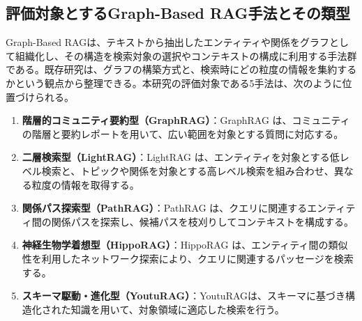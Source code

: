 \documentclass[a4j,dvipdfmx]{jsarticle}
\begin{document}
\subsection{評価対象とするGraph-Based RAG手法とその類型}
Graph-Based RAGは、テキストから抽出したエンティティや関係をグラフとして組織化し、その構造を検索対象の選択やコンテキストの構成に利用する手法群である。既存研究は、グラフの構築方式と、検索時にどの粒度の情報を集約するかという観点から整理できる\cite{pan2024unifying}。本研究の評価対象である5手法は、次のように位置づけられる。
\begin{enumerate}
    \item \textbf{階層的コミュニティ要約型（GraphRAG）}：GraphRAG \cite{edge2024graphrag} は、コミュニティの階層と要約レポートを用いて、広い範囲を対象とする質問に対応する。
    \item \textbf{二層検索型（LightRAG）}：LightRAG \cite{guo2024lightrag} は、エンティティを対象とする低レベル検索と、トピックや関係を対象とする高レベル検索を組み合わせ、異なる粒度の情報を取得する。
    \item \textbf{関係パス探索型（PathRAG）}：PathRAG \cite{chen2024pathrag} は、クエリに関連するエンティティ間の関係パスを探索し、候補パスを枝刈りしてコンテキストを構成する。
    \item \textbf{神経生物学着想型（HippoRAG）}：HippoRAG \cite{gutierrez2024hipporag} は、エンティティ間の類似性を利用したネットワーク探索により、クエリに関連するパッセージを検索する。
    \item \textbf{スキーマ駆動・進化型（YoutuRAG）}：YoutuRAGは、スキーマに基づき構造化された知識を用いて、対象領域に適応した検索を行う\cite{dong2025youtu}。
\end{enumerate}
\end{document}
